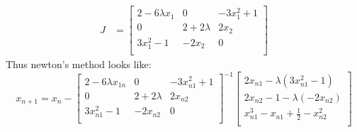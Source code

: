 \documentclass{article}
\begin{document}
\begin{enumerate}[label=\alph*.)]
\begin{align*}
J &= \begin{bmatrix}
2 - 6\lambda x_1 & 0 & -3x_1^2 + 1 \\
0 & 2 + 2\lambda & 2x_2 \\
3x_1^2 - 1 & -2x_2 & 0 \\
\end{bmatrix}
\end{align*}
Thus newton's method looks like:\\
\[
x_{n+1} = x_{n} -  \begin{bmatrix}
2 - 6\lambda x_{1n} & 0 & -3x_{n1}^2 + 1 \\
0 & 2 + 2\lambda & 2x_{n2} \\
3x_{n1}^2 - 1 & -2x_{n2} & 0 \\
\end{bmatrix}^{-1}
\begin{bmatrix}
2x_{n1} - \lambda(3x_{n1}^2 - 1) \\
2x_{n2} - 1 - \lambda(-2x_{n2}) \\
x_{n1}^3 - x_{n1} + \frac{1}{2} - x_{n2}^2 \\
\end{bmatrix}
\]


\end{enumerate}
\end{document}

